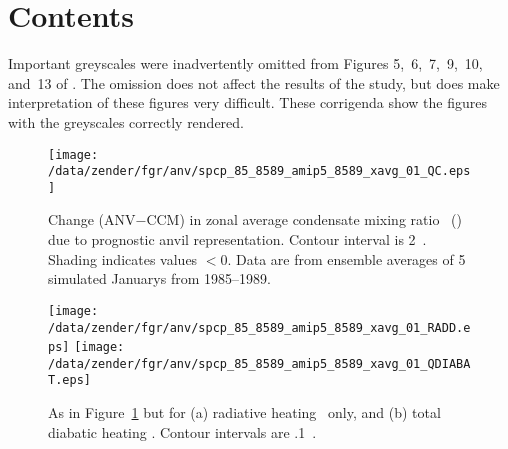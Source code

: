 \documentclass[twocolumn,final]{article}
\begin{document}
\setlength\abovecaptionskip{9pt}
\setlength\belowcaptionskip{9pt}

\setlength\floatsep{0pt}
\setlength\textfloatsep{0pt}
\setlength\dblfloatsep{0pt}
\setlength\dbltextfloatsep{0pt}
\setlength\intextsep{0pt}

\pagestyle{myheadings}
\setcounter{page}{1}

\section{Contents}
Important greyscales were inadvertently omitted from Figures
5,~6,~7,~9,~10, and~13 of \cite{Zek972}.   
The omission does not affect the results of the study, but does make 
interpretation of these figures very difficult.
These corrigenda show the figures with the greyscales correctly
rendered.   

\setcounter{figure}{4}
\begin{figure}
\begin{center}
\texttt{[image: /data/zender/fgr/anv/spcp\_85\_8589\_amip5\_8589\_xavg\_01\_QC.eps]}\vfill
\end{center}
\caption{
Change (ANV$-$CCM) in zonal average condensate mixing ratio \qc\
(\mgxkg) due to prognostic anvil representation.
Contour interval is 2~\mgxkg.
Shading indicates values $< 0$.
Data are from ensemble averages of 5 simulated Januarys from
1985--1989.
\label{fig:xavg_8589_QC}}   
\end{figure}

\begin{figure}
\begin{center}
\texttt{[image: /data/zender/fgr/anv/spcp\_85\_8589\_amip5\_8589\_xavg\_01\_RADD.eps]}\vfill
\texttt{[image: /data/zender/fgr/anv/spcp\_85\_8589\_amip5\_8589\_xavg\_01\_QDIABAT.eps]}\vfill
\end{center}
\caption{
As in Figure~\ref{fig:xavg_8589_QC} but for (a) radiative heating \QR\
only, and (b) total diabatic heating \QT.
Contour intervals are .1~\kxday.   
\label{fig:xavg_8589_QDIABAT}}   
\end{figure}
\end{document}
